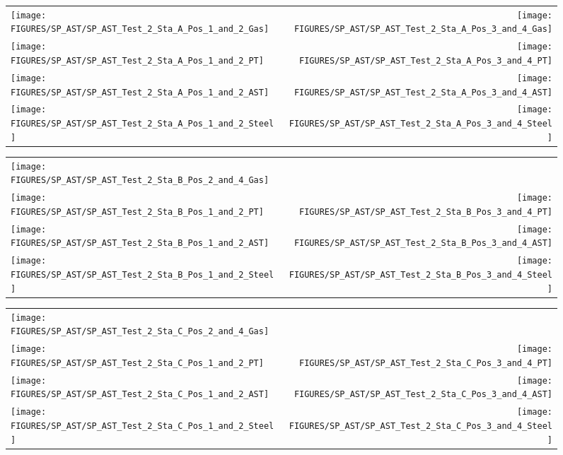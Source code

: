 \begin{figure}[p]
\begin{tabular*}{\textwidth}{l@{\extracolsep{\fill}}r}
\texttt{[image: FIGURES/SP\_AST/SP\_AST\_Test\_2\_Sta\_A\_Pos\_1\_and\_2\_Gas]} &
\texttt{[image: FIGURES/SP\_AST/SP\_AST\_Test\_2\_Sta\_A\_Pos\_3\_and\_4\_Gas]} \\
\texttt{[image: FIGURES/SP\_AST/SP\_AST\_Test\_2\_Sta\_A\_Pos\_1\_and\_2\_PT]} &
\texttt{[image: FIGURES/SP\_AST/SP\_AST\_Test\_2\_Sta\_A\_Pos\_3\_and\_4\_PT]} \\
\texttt{[image: FIGURES/SP\_AST/SP\_AST\_Test\_2\_Sta\_A\_Pos\_1\_and\_2\_AST]} &
\texttt{[image: FIGURES/SP\_AST/SP\_AST\_Test\_2\_Sta\_A\_Pos\_3\_and\_4\_AST]} \\
\texttt{[image: FIGURES/SP\_AST/SP\_AST\_Test\_2\_Sta\_A\_Pos\_1\_and\_2\_Steel]} &
\texttt{[image: FIGURES/SP\_AST/SP\_AST\_Test\_2\_Sta\_A\_Pos\_3\_and\_4\_Steel]}
\end{tabular*}
\label{SP_Test_2_Station_A}
\end{figure}

\begin{figure}[p]
\begin{tabular*}{\textwidth}{l@{\extracolsep{\fill}}r}
\texttt{[image: FIGURES/SP\_AST/SP\_AST\_Test\_2\_Sta\_B\_Pos\_2\_and\_4\_Gas]} &
  \\
\texttt{[image: FIGURES/SP\_AST/SP\_AST\_Test\_2\_Sta\_B\_Pos\_1\_and\_2\_PT]} &
\texttt{[image: FIGURES/SP\_AST/SP\_AST\_Test\_2\_Sta\_B\_Pos\_3\_and\_4\_PT]} \\
\texttt{[image: FIGURES/SP\_AST/SP\_AST\_Test\_2\_Sta\_B\_Pos\_1\_and\_2\_AST]} &
\texttt{[image: FIGURES/SP\_AST/SP\_AST\_Test\_2\_Sta\_B\_Pos\_3\_and\_4\_AST]} \\
\texttt{[image: FIGURES/SP\_AST/SP\_AST\_Test\_2\_Sta\_B\_Pos\_1\_and\_2\_Steel]} &
\texttt{[image: FIGURES/SP\_AST/SP\_AST\_Test\_2\_Sta\_B\_Pos\_3\_and\_4\_Steel]}
\end{tabular*}
\label{SP_Test_2_Station_B}
\end{figure}

\begin{figure}[p]
\begin{tabular*}{\textwidth}{l@{\extracolsep{\fill}}r}
\texttt{[image: FIGURES/SP\_AST/SP\_AST\_Test\_2\_Sta\_C\_Pos\_2\_and\_4\_Gas]} &
  \\
\texttt{[image: FIGURES/SP\_AST/SP\_AST\_Test\_2\_Sta\_C\_Pos\_1\_and\_2\_PT]} &
\texttt{[image: FIGURES/SP\_AST/SP\_AST\_Test\_2\_Sta\_C\_Pos\_3\_and\_4\_PT]} \\
\texttt{[image: FIGURES/SP\_AST/SP\_AST\_Test\_2\_Sta\_C\_Pos\_1\_and\_2\_AST]} &
\texttt{[image: FIGURES/SP\_AST/SP\_AST\_Test\_2\_Sta\_C\_Pos\_3\_and\_4\_AST]} \\
\texttt{[image: FIGURES/SP\_AST/SP\_AST\_Test\_2\_Sta\_C\_Pos\_1\_and\_2\_Steel]} &
\texttt{[image: FIGURES/SP\_AST/SP\_AST\_Test\_2\_Sta\_C\_Pos\_3\_and\_4\_Steel]}
\end{tabular*}
\label{SP_Test_2_Station_C}
\end{figure}


